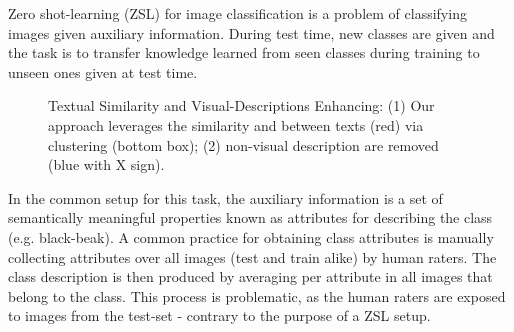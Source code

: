 \documentclass[11pt,a4paper]{article}
\begin{document}
Zero shot-learning (ZSL) for image classification is a problem of classifying images given auxiliary information. During test time, new classes are given and the task is to transfer knowledge learned from seen classes during training to unseen ones given at test time.


\begin{figure}[th]
\centering
{}
 \caption{Textual Similarity and Visual-Descriptions Enhancing: (1) Our approach leverages the similarity and  between texts (red) via clustering (bottom box); (2) non-visual description are removed (blue with X sign). }
\label{fig:bird_example}%
\end{figure}

In the common setup for this task, the auxiliary information is a set of semantically meaningful properties known as attributes for describing the class (e.g. black-beak)\citep{farhadi2009describing,lampert2009learning}. A common practice for obtaining class attributes is manually collecting attributes over all images (test and train alike) by human raters. The class description is then produced by averaging per attribute in all images that belong to the class. This process is problematic, as the human raters are exposed to images from the test-set - contrary to the purpose of a ZSL setup.\par
\end{document}
